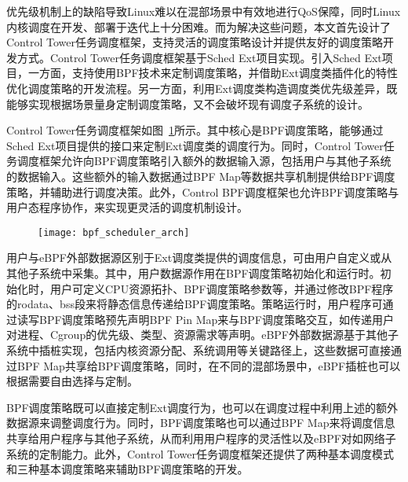 优先级机制上的缺陷导致Linux难以在混部场景中有效地进行QoS保障，同时Linux内核调度在开发、部署于迭代上十分困难。而为解决这些问题，本文首先设计了Control Tower任务调度框架，支持灵活的调度策略设计并提供友好的调度策略开发方式。Control Tower任务调度框架基于Sched Ext项目实现。引入Sched Ext项目，一方面，支持使用BPF技术来定制调度策略，并借助Ext调度类插件化的特性优化调度策略的开发流程。另一方面，利用Ext调度类构造调度类优先级差异，既能够实现根据场景量身定制调度策略，又不会破坏现有调度子系统的设计。

Control Tower任务调度框架如图~\ref{fig:bpf_scheduler_arch}所示。其中核心是BPF调度策略，能够通过Sched Ext项目提供的接口来定制Ext调度类的调度行为。同时，Control Tower任务调度框架允许向BPF调度策略引入额外的数据输入源，包括用户与其他子系统的数据输入。这些额外的输入数据通过BPF Map等数据共享机制提供给BPF调度策略，并辅助进行调度决策。此外，Control BPF调度框架也允许BPF调度策略与用户态程序协作，来实现更灵活的调度机制设计。

\begin{figure}[H]
    \centering
    \texttt{[image: bpf\_scheduler\_arch]}
    \label{fig:bpf_scheduler_arch}
\end{figure}

用户与eBPF外部数据源区别于Ext调度类提供的调度信息，可由用户自定义或从其他子系统中采集。其中，用户数据源作用在BPF调度策略初始化和运行时。初始化时，用户可定义CPU资源拓扑、BPF调度策略参数等，并通过修改BPF程序的rodata、bss段来将静态信息传递给BPF调度策略。策略运行时，用户程序可通过读写BPF调度策略预先声明BPF Pin Map来与BPF调度策略交互，如传递用户对进程、Cgroup的优先级、类型、资源需求等声明。eBPF外部数据源基于其他子系统中插桩实现，包括内核资源分配、系统调用等关键路径上，这些数据可直接通过BPF Map共享给BPF调度策略，同时，在不同的混部场景中，eBPF插桩也可以根据需要自由选择与定制。

BPF调度策略既可以直接定制Ext调度行为，也可以在调度过程中利用上述的额外数据源来调整调度行为。同时，BPF调度策略也可以通过BPF Map来将调度信息共享给用户程序与其他子系统，从而利用用户程序的灵活性以及eBPF对如网络子系统的定制能力。此外，Control Tower任务调度框架还提供了两种基本调度模式和三种基本调度策略来辅助BPF调度策略的开发。 

